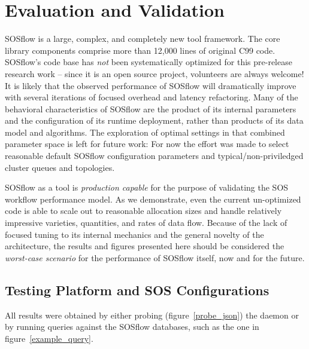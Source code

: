 
\section{Evaluation and Validation}

SOSflow is a large, complex, and completely new tool framework.
%
The core library components comprise more than 12,000 lines of
original C99 code.
%
SOSflow's code base has \textit{not} been systematically optimized for
this pre-release research work -- since it is an open source project,
volunteers are always welcome!
%
It is likely that the observed performance of SOSflow will
dramatically improve with several iterations of focused overhead and
latency refactoring.
%
Many of the behavioral characteristics of SOSflow are the product of
its internal parameters and the configuration of its runtime
deployment, rather than products of its data model and algorithms.
%
The exploration of optimal settings in that combined parameter space
is left for future work: For now the effort was made to select
reasonable default SOSflow configuration parameters and
typical/non-priviledged cluster queues and topologies.

SOSflow as a tool is \textit{production capable} for the purpose of
validating the SOS workflow performance model.
%
As we demonstrate, even the current un-optimized code is able to scale
out to reasonable allocation sizes and handle relatively impressive
varieties, quantities, and rates of data flow.
%
Because of the lack of focused tuning to its internal mechanics and
the general novelty of the architecture, the results and figures
presented here should be considered the \textit{worst-case scenario}
for the performance of SOSflow itself, now and for the future.

\subsection{Testing Platform and SOS Configurations}

All results were obtained by either probing (figure~\ref{probe_json})
the daemon or by running queries against the SOSflow databases, such
as the one in figure~\ref{example_query}.


